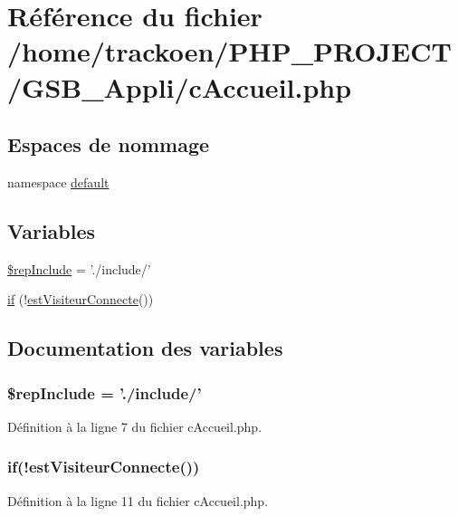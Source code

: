 \hypertarget{c_accueil_8php}{\section{Référence du fichier /home/trackoen/\-P\-H\-P\-\_\-\-P\-R\-O\-J\-E\-C\-T/\-G\-S\-B\-\_\-\-Appli/c\-Accueil.php}
\label{c_accueil_8php}
}
\subsection*{Espaces de nommage}
\begin{DoxyCompactItemize}
\item 
namespace \hyperlink{namespacedefault}{default}
\end{DoxyCompactItemize}
\subsection*{Variables}
\begin{DoxyCompactItemize}
\item 
\hyperlink{c_accueil_8php_aad2a80747c2de66b59cb18d493ae7a8b}{\$rep\-Include} = './include/'
\item 
\hyperlink{c_accueil_8php_a5b407bc19b08452156cf04e24ef10ed7}{if} (!\hyperlink{__gestion_session_8lib_8php_afe911e51f16958708b8b700981cd2567}{est\-Visiteur\-Connecte}())
\end{DoxyCompactItemize}


\subsection{Documentation des variables}
\hypertarget{c_accueil_8php_aad2a80747c2de66b59cb18d493ae7a8b}{
\subsubsection[{\$rep\-Include}]{\setlength{\rightskip}{0pt plus 5cm}\$rep\-Include = './include/'}}\label{c_accueil_8php_aad2a80747c2de66b59cb18d493ae7a8b}


Définition à la ligne 7 du fichier c\-Accueil.\-php.

\hypertarget{c_accueil_8php_a5b407bc19b08452156cf04e24ef10ed7}{
\subsubsection[{if}]{\setlength{\rightskip}{0pt plus 5cm}if(!{\bf est\-Visiteur\-Connecte}())}}\label{c_accueil_8php_a5b407bc19b08452156cf04e24ef10ed7}


Définition à la ligne 11 du fichier c\-Accueil.\-php.

